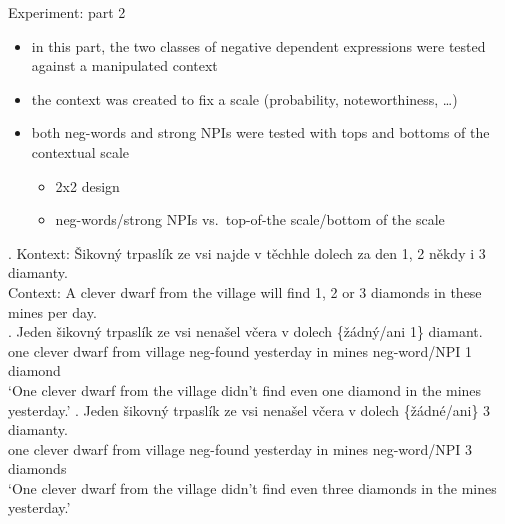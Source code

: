 \documentclass[
  ignorenonframetext,
]{beamer}
\providecommand{\tightlist}{%
  \setlength{\itemsep}{0pt}\setlength{\parskip}{0pt}}
\begin{document}
\begin{frame}
\begin{block}{Experiment: part 2}
\protect\hypertarget{experiment-part-2}{}
\begin{itemize}
\tightlist
\item
  in this part, the two classes of negative dependent expressions were
  tested against a manipulated context
\item
  the context was created to fix a scale (probability, noteworthiness,
  \ldots)
\item
  both neg-words and strong NPIs were tested with tops and bottoms of
  the contextual scale

  \begin{itemize}
  \tightlist
  \item
    2x2 design
  \item
    neg-words/strong NPIs vs.~top-of-the scale/bottom of the scale
  \end{itemize}
\end{itemize}
\end{block}
\end{frame}

\begin{frame}
\ex. Kontext: Šikovný trpaslík ze vsi najde v těchhle dolech za den 1, 2
někdy i 3 diamanty.\\
Context: A clever dwarf from the village will find 1, 2 or 3 diamonds in
these mines per day.\\
\ag. Jeden šikovný trpaslík ze vsi nenašel včera v dolech \{žádný/ani
1\} diamant.\\
one clever dwarf from village neg-found yesterday in mines neg-word/NPI
1 diamond\\
`One clever dwarf from the village didn't find even one diamond in the
mines yesterday.' \bg. Jeden šikovný trpaslík ze vsi nenašel včera v
dolech \{žádné/ani\} 3 diamanty.\\
one clever dwarf from village neg-found yesterday in mines neg-word/NPI
3 diamonds\\
`One clever dwarf from the village didn't find even three diamonds in
the mines yesterday.'

~
\end{frame}
\end{document}
